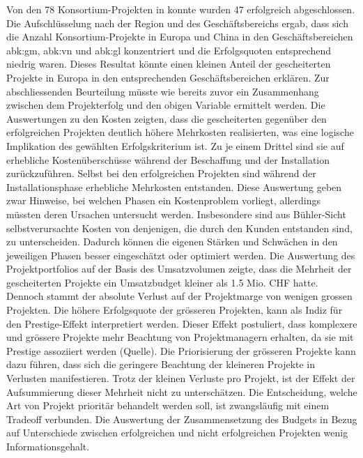 \newline Von den 78 Konsortium-Projekten in konnte wurden 47 erfolgreich abgeschlossen. Die Aufschlüsselung nach der Region und des Geschäftsbereichs ergab, dass sich die Anzahl Konsortium-Projekte in Europa und China in den Geschäftsbereichen \gls{abk:gm}, \gls{abk:vn} und \gls{abk:gl} konzentriert und die Erfolgsquoten entsprechend niedrig waren. Dieses Resultat könnte einen kleinen Anteil der gescheiterten Projekte in Europa in den entsprechenden Geschäftsbereichen erklären. 
\newline Zur abschliessenden Beurteilung müsste wie bereits zuvor ein Zusammenhang zwischen dem Projekterfolg und den obigen Variable ermittelt werden.
\newline\newline
Die Auswertungen zu den Kosten zeigten, dass die gescheiterten gegenüber den erfolgreichen Projekten deutlich höhere Mehrkosten realisierten, was eine logische Implikation des gewählten Erfolgskriterium ist. Zu je einem Drittel sind sie auf erhebliche Kostenüberschüsse während der Beschaffung und der Installation zurückzuführen. Selbst bei den erfolgreichen Projekten sind während der Installationsphase erhebliche Mehrkosten entstanden. Diese Auswertung geben zwar Hinweise, bei welchen Phasen ein Kostenproblem vorliegt, allerdings müssten deren Ursachen untersucht werden. Insbesondere sind aus Bühler-Sicht selbstverursachte Kosten von denjenigen, die durch den Kunden entstanden sind, zu unterscheiden. Dadurch können die eigenen Stärken und Schwächen in den jeweiligen Phasen besser eingeschätzt oder optimiert werden. Die Auswertung des Projektportfolios auf der Basis des Umsatzvolumen zeigte, dass die Mehrheit der gescheiterten Projekte ein Umsatzbudget kleiner als 1.5 Mio. CHF hatte. Dennoch stammt der absolute Verlust auf der Projektmarge von wenigen grossen Projekten. Die höhere Erfolgsquote der grösseren Projekten, kann als Indiz für den Prestige-Effekt interpretiert werden. Dieser Effekt postuliert, dass komplexere und grössere Projekte mehr Beachtung von Projektmanagern erhalten, da sie mit Prestige assoziiert werden (Quelle). Die Priorisierung der grösseren Projekte kann dazu führen, dass sich die geringere Beachtung der kleineren Projekte in Verlusten manifestieren. Trotz der kleinen Verluste pro Projekt, ist der Effekt der Aufsummierung dieser Mehrheit nicht zu unterschätzen. Die Entscheidung, welche Art von Projekt prioritär behandelt werden soll, ist zwangsläufig mit einem Tradeoff verbunden. Die Auswertung der Zusammensetzung des Budgets in Bezug auf Unterschiede zwischen erfolgreichen und nicht erfolgreichen Projekten wenig Informationsgehalt.
